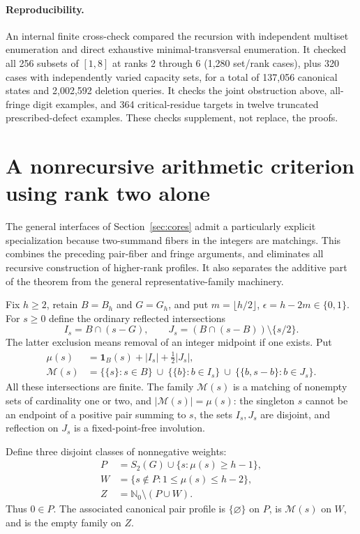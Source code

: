 \documentclass[11pt]{article}
\theoremstyle{remark}\newtheorem{remark}[theorem]{Remark}
\newcommand{\N}{\mathbb N_0}
\begin{document}
\paragraph{Reproducibility.} An internal finite cross-check compared the recursion with independent multiset enumeration and direct exhaustive minimal-transversal enumeration. It checked all 256 subsets of $[1,8]$ at ranks 2 through 6 (1,280 set/rank cases), plus 320 cases with independently varied capacity sets, for a total of 137,056 canonical states and 2,002,592 deletion queries. It checks the joint obstruction above, all-fringe digit examples, and 364 critical-residue targets in twelve truncated prescribed-defect examples. These checks supplement, not replace, the proofs.

\section{A nonrecursive arithmetic criterion using rank two alone}\label{sec:pairdirect}
The general interfaces of Section~\ref{sec:cores} admit a particularly explicit specialization because two-summand fibers in the integers are matchings. This combines the preceding pair-fiber and fringe arguments, and eliminates all recursive construction of higher-rank profiles. It also separates the additive part of the theorem from the general representative-family machinery.

Fix $h\ge2$, retain $B=B_h$ and $G=G_h$, and put $m=\lfloor h/2\rfloor$, $\epsilon=h-2m\in\{0,1\}$. For $s\ge0$ define the ordinary reflected intersections
\[
 I_s=B\cap(s-G),\qquad J_s=(B\cap(s-B))\setminus\{s/2\}.
\]
The latter exclusion means removal of an integer midpoint if one exists. Put
\begin{align*}
 \mu(s)&=\mathbf 1_B(s)+|I_s|+\tfrac12|J_s|,\\
 \mathcal M(s)&=\{\{s\}:s\in B\}\ \cup\ \{\{b\}:b\in I_s\}\ \cup\ \{\{b,s-b\}:b\in J_s\}.
\end{align*}
All these intersections are finite. The family $\mathcal M(s)$ is a matching of nonempty sets of cardinality one or two, and $|\mathcal M(s)|=\mu(s)$: the singleton $s$ cannot be an endpoint of a positive pair summing to $s$, the sets $I_s,J_s$ are disjoint, and reflection on $J_s$ is a fixed-point-free involution.

Define three disjoint classes of nonnegative weights:
\begin{align*}
 P&=S_2(G)\cup\{s:\mu(s)\ge h-1\},\\
 W&=\{s\notin P:1\le\mu(s)\le h-2\},\\
 Z&=\N\setminus(P\cup W).
\end{align*}
Thus $0\in P$. The associated canonical pair profile is $\{\varnothing\}$ on $P$, is $\mathcal M(s)$ on $W$, and is the empty family on $Z$.
\end{document}
